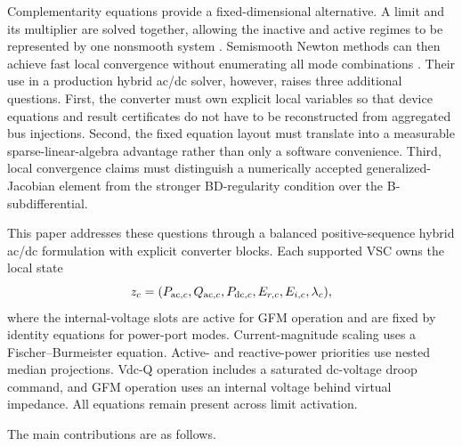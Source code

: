 Complementarity equations provide a fixed-dimensional alternative. A limit
and its multiplier are solved together, allowing the inactive and active
regimes to be represented by one nonsmooth system
\cite{facchinei2003complementarity,fischer1992newton}. Semismooth Newton
methods can then achieve fast local convergence without enumerating all mode
combinations \cite{qi1993nonsmooth}. Their use in a production hybrid ac/dc
solver, however, raises three additional questions. First, the converter must
own explicit local variables so that device equations and result certificates
do not have to be reconstructed from aggregated bus injections. Second, the
fixed equation layout must translate into a measurable sparse-linear-algebra
advantage rather than only a software convenience. Third, local convergence
claims must distinguish a numerically accepted generalized-Jacobian element
from the stronger BD-regularity condition over the B-subdifferential.

This paper addresses these questions through a balanced positive-sequence
hybrid ac/dc formulation with explicit converter blocks. Each supported VSC
owns the local state
\begin{equation}
 z_c=(P_{\mathrm{ac},c},Q_{\mathrm{ac},c},P_{\mathrm{dc},c},E_{r,c},E_{i,c},\lambda_c),
 \label{eq:local-state-intro}
\end{equation}
where the internal-voltage slots are active for GFM operation and are fixed by
identity equations for power-port modes. Current-magnitude scaling uses a
Fischer--Burmeister equation. Active- and reactive-power priorities use nested
median projections. Vdc-Q operation includes a saturated dc-voltage droop
command, and GFM operation uses an internal voltage behind virtual impedance.
All equations remain present across limit activation.

The main contributions are as follows.

